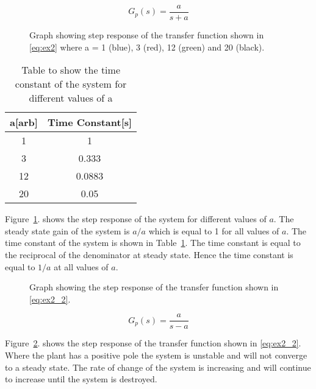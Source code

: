 \renewcommand{\ex}{ex2} 

\begin{equation}
    G_{p}\left(s\right)=\frac{a}{s+a}
    \label{eq:\ex}
\end{equation}

\begin{figure}[ht!]
    \centering
    
    \caption{Graph showing step response of the transfer function shown in \eqref{eq:\ex} where a = 1 (blue), 3 (red), 12 (green) and 20 (black). \appendixamble{\ex}} 
    \label{fig:\ex}
\end{figure}\FloatBarrier

\begin{table}[ht!]
    \centering
    \begin{tabular}{|c|c|}
        \hline
        a{[}arb{]} & Time Constant{[}s{]} \\ \hline
        1          & 1                    \\ \hline
        3          & 0.333                \\ \hline
        12         & 0.0883               \\ \hline
        20         & 0.05                 \\ \hline
    \end{tabular}
    \caption{Table to show the time constant of the system for different values of a}
    \label{tab:\ex}
\end{table}\FloatBarrier

Figure~\ref{fig:\ex}. shows the step response of the system for different values of $a$. The steady state gain of the system is $a/a$ which is equal to 1 for all values of $a$. The time constant of the system is shown in Table~\ref{tab:\ex}. The time constant is equal to the reciprocal of the denominator at steady state. Hence the time constant is equal to $1/a$ at all values of $a$.\\

\begin{figure}[ht!]
    \centering
    
    \caption{Graph showing the step response of the transfer function shown in \eqref{eq:\ex_2}. \appendixamble{\ex}}
    \label{fig:\ex_2}
\end{figure}\FloatBarrier

\begin{equation}
    G_{p}\left(s\right)=\frac{a}{s-a}
    \label{eq:\ex_2}
\end{equation}

Figure~\ref{fig:\ex_2}. shows the step response of the transfer function shown in \eqref{eq:\ex_2}. Where the plant has a positive pole the system is unstable and will not converge to a steady state. The rate of change of the system is increasing and will continue to increase until the system is destroyed. 

